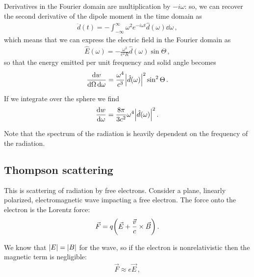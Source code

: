 \documentclass[main.tex]{subfiles}
\begin{document}
Derivatives in the Fourier domain are multiplication by \(-i \omega \): so, we can recover the second derivative of the dipole moment in the time domain as 
%
\begin{align}
\ddot{d} (t) = - \int_{- \infty }^{\infty } \omega^2 e^{-i \omega t} \hat{d}(\omega ) \dd{\omega }
\,,
\end{align}
%
which means that we can express the electric field in the Fourier domain as 
%
\begin{align}
\hat{E} ( \omega ) = - \frac{\omega^2}{c^2 R} \hat{d}(\omega ) \sin \Theta 
\,,
\end{align}
%
so that the energy emitted per unit frequency and solid angle becomes 
%
\begin{align}
\frac{ \dd{w}}{ \dd{\Omega } \dd{\omega }}  = \frac{\omega^{4}}{c^3} \abs{\hat{d}(\omega  )}^2 \sin^2 \Theta 
\,.
\end{align}

If we integrate over the sphere we find 
%
\begin{align}
\dv{w}{\omega } = \frac{8 \pi }{3 c^2} \omega^{4} \abs{\hat{d}(\omega )}^2
\,.
\end{align}

Note that the spectrum of the radiation is heavily dependent on the frequency of the radiation. 

\subsection{Thompson scattering}

This is scattering of radiation by free electrons. 
Consider a plane, linearly polarized, electromagnetic wave impacting a free electron. The force onto the electron is the Lorentz force: 
%
\begin{align}
\vec{F} = q \qty(\vec{E} + \frac{\vec{v}}{c} \times \vec{B})
\,.
\end{align}

We know that \(\abs{E} = \abs{B}\) for the wave, so if the electron is nonrelativistic then the magnetic term is negligible: 
%
\begin{align}
\vec{F} \approx e \vec{E}
\,,
\end{align}
%
\end{document}
